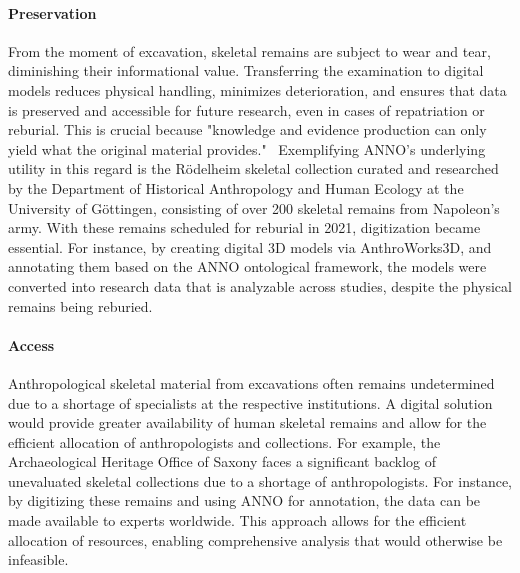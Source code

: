 \documentclass[sw]{iosart2x}
\begin{document}
\paragraph{Preservation}\label{sec:preserve}
From the moment of excavation, skeletal remains are subject to wear and tear, diminishing their informational value.
Transferring the examination to digital models reduces physical handling, minimizes deterioration, and ensures that data is preserved and accessible for future research, even in cases of repatriation or reburial.
This is crucial because "knowledge and evidence production can only yield what the original material provides."~\cite[p.~132]{HeuschkelSchmiedelLabudde2024}
Exemplifying ANNO's underlying utility in this regard is the Rödelheim skeletal collection curated and researched by the Department of Historical Anthropology and Human Ecology at the University of Göttingen, consisting of over 200 skeletal remains from Napoleon's army.
With these remains scheduled for reburial in 2021, digitization became essential.
For instance, by creating digital 3D models via AnthroWorks3D, and annotating them based on the ANNO ontological framework, the models were converted into research data that is analyzable across studies, despite the physical remains being reburied.

\paragraph{Access}\label{sec:access}
Anthropological skeletal material from excavations often remains undetermined due to a shortage of specialists at the respective institutions.
A digital solution would provide greater availability of human skeletal remains and allow for the efficient allocation of anthropologists and collections.
For example, the Archaeological Heritage Office of Saxony faces a significant backlog of unevaluated skeletal collections due to a shortage of anthropologists.
For instance, by digitizing these remains and using ANNO for annotation, the data can be made available to experts worldwide.
This approach allows for the efficient allocation of resources, enabling comprehensive analysis that would otherwise be infeasible.
\end{document}
